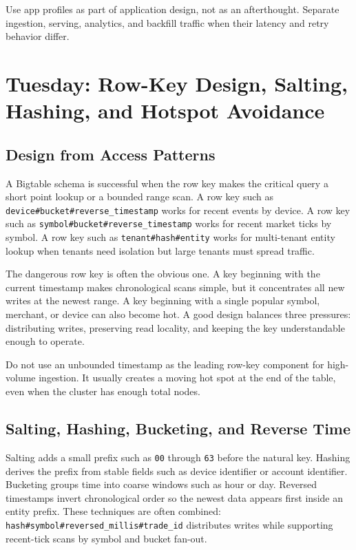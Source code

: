 \begin{tipbox}
Use app profiles as part of application design, not as an afterthought. Separate ingestion, serving, analytics, and backfill traffic when their latency and retry behavior differ.
\end{tipbox}

\section{Tuesday: Row-Key Design, Salting, Hashing, and Hotspot Avoidance}

\subsection{Design from Access Patterns}
A Bigtable schema is successful when the row key makes the critical query a short point lookup or a bounded range scan. A row key such as \texttt{device\#bucket\#reverse\_timestamp} works for recent events by device. A row key such as \texttt{symbol\#bucket\#reverse\_timestamp} works for recent market ticks by symbol. A row key such as \texttt{tenant\#hash\#entity} works for multi-tenant entity lookup when tenants need isolation but large tenants must spread traffic.

The dangerous row key is often the obvious one. A key beginning with the current timestamp makes chronological scans simple, but it concentrates all new writes at the newest range. A key beginning with a single popular symbol, merchant, or device can also become hot. A good design balances three pressures: distributing writes, preserving read locality, and keeping the key understandable enough to operate.

\begin{pitfall}
Do not use an unbounded timestamp as the leading row-key component for high-volume ingestion. It usually creates a moving hot spot at the end of the table, even when the cluster has enough total nodes.
\end{pitfall}
\subsection{Salting, Hashing, Bucketing, and Reverse Time}
Salting adds a small prefix such as \texttt{00} through \texttt{63} before the natural key. Hashing derives the prefix from stable fields such as device identifier or account identifier. Bucketing groups time into coarse windows such as hour or day. Reversed timestamps invert chronological order so the newest data appears first inside an entity prefix. These techniques are often combined: \texttt{hash\#symbol\#reversed\_millis\#trade\_id} distributes writes while supporting recent-tick scans by symbol and bucket fan-out.


